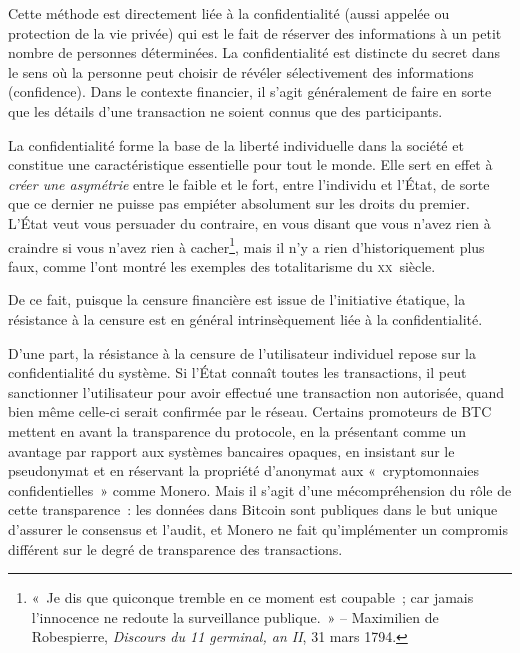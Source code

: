 Cette méthode est directement liée à la confidentialité (aussi appelée  ou protection de la vie privée) qui est le fait de réserver des informations à un petit nombre de personnes déterminées. La confidentialité est distincte du secret dans le sens où la personne peut choisir de révéler sélectivement des informations (confidence). Dans le contexte financier, il s'agit généralement de faire en sorte que les détails d'une transaction ne soient connus que des participants.

La confidentialité forme la base de la liberté individuelle dans la société et constitue une caractéristique essentielle pour tout le monde. Elle sert en effet à \emph{créer une asymétrie} entre le faible et le fort, entre l'individu et l'État, de sorte que ce dernier ne puisse pas empiéter absolument sur les droits du premier. L'État veut vous persuader du contraire, en vous disant que vous n'avez rien à craindre si vous n'avez rien à cacher\footnote{«~Je dis que quiconque tremble en ce moment est coupable~; car jamais l'innocence ne redoute la surveillance publique.~» -- Maximilien de Robespierre, \emph{Discours du 11 germinal, an II}, 31 mars 1794.}, mais il n'y a rien d'historiquement plus faux, comme l'ont montré les exemples des totalitarisme du \textsc{xx}\ieme{}~siècle.


De ce fait, puisque la censure financière est issue de l'initiative étatique, la résistance à la censure est en général intrinsèquement liée à la confidentialité.

D'une part, la résistance à la censure de l'utilisateur individuel repose sur la confidentialité du système. Si l'État connaît toutes les transactions, il peut sanctionner l'utilisateur pour avoir effectué une transaction non autorisée, quand bien même celle-ci serait confirmée par le réseau. Certains promoteurs de BTC mettent en avant la transparence du protocole, en la présentant comme un avantage par rapport aux systèmes bancaires opaques, en insistant sur le pseudonymat et en réservant la propriété d'anonymat aux «~cryptomonnaies confidentielles~» comme Monero. Mais il s'agit d'une mécompréhension du rôle de cette transparence~: les données dans Bitcoin sont publiques dans le but unique d'assurer le consensus et l'audit, et Monero ne fait qu'implémenter un compromis différent sur le degré de transparence des transactions.

